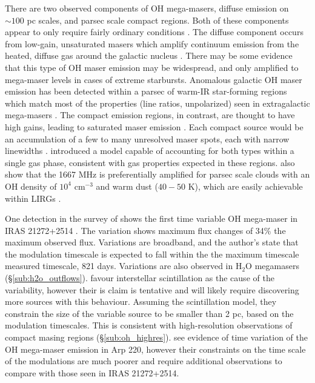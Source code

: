 There are two observed components of OH mega-masers, diffuse emission on $\sim 100$ pc scales, and parsec scale compact regions. Both of these components appear to only require fairly ordinary conditions \citep{lo2005}. The diffuse component occurs from low-gain, unsaturated masers which amplify continuum emission from the heated, diffuse gas around the galactic nucleus \citep[e.g.]{Baan_1985}. There may be some evidence that this type of OH maser emission may be widespread, and only amplified to mega-maser levels in cases of extreme starbursts. Anomalous galactic OH maser emission has been detected within a parsec of warm-IR star-forming regions which match most of the properties (line ratios, unpolarized) seen in extragalactic mega-masers \cite{Mirabel_1989}.  The compact emission regions, in contrast, are thought to have high gains, leading to saturated maser emission \citep[e.g.,]{lonsdale2002}. Each compact source would be an accumulation of a few to many unresolved maser spots, each with narrow linewidths \citet{lo2005}.  \citet{Parra_2005} introduced a model capable of accounting for both types within a single gas phase, consistent with gas properties expected in these regions. \citet{randell1995} also show that the 1667 MHz is preferentially amplified for parsec scale clouds with an OH density of $10^4$ cm$^{-3}$ and warm dust ($40-50$ K), which are easily achievable within LIRGs \citep{lo2005}.

One detection in the survey of \citet{darling2002_paperIII} shows the first time variable OH mega-maser in IRAS 21272+2514 \citep[$z\sim 0.15$]{darling2002_timevar}. The variation shows maximum flux changes of 34\% the maximum observed flux. Variations are broadband, and the author's state that the modulation timescale is expected to fall within the the maximum timescale measured timescale, 821 days. Variations are also observed in H$_{2}$O megamasers (\S\ref{sub:h2o_outflows}). \citet{darling2002_timevar} favour interstellar scintillation as the cause of the variability, however their is claim is tentative and will likely require discovering more sources with this behaviour. Assuming the scintillation model, they constrain the size of the variable source to be smaller than 2 pc, based on the modulation timescales. This is consistent with high-resolution observations of compact masing regions (\S\ref{sub:oh_highres}). \citet{Lonsdale_2007} see evidence of time variation of the OH mega-maser emission in Arp 220, however their constraints on the time scale of the modulations are much poorer and require additional observations to compare with those seen in IRAS 21272+2514.


